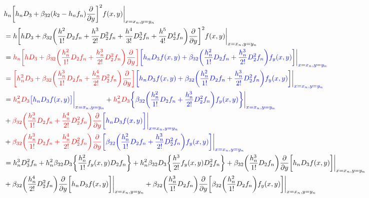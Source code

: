 \documentclass[12 pt]{article}
\begin{document}
{
\normalsize
\begin{align*}
&h_{n}\bigg[h_{n}D_{3}+\beta_{32}(k_{2}-h_{n}f_{n})\frac{\partial}{\partial y}\bigg]^{2}f(x,y)\bigg\vert_{x = x_{n}, y= y_{n}} \\
&= h\bigg[hD_{3} + \beta_{32}\bigg(\frac{h^{2}}{1!}D_{2}f_{n} + \frac{h^{3}}{2!}D_{2}^{2}f_{n} + \frac{h^{4}}{3!}D_{2}^{3}f_{n} + \frac{h^{5}}{4!}D_{2}^{4}f_{n}\bigg)\frac{\partial}{\partial y}\bigg]^{2}f(x,y)\bigg\vert_{x = x_{n}, y= y_{n}}\\
&= \color{red}h_{n}\bigg[hD_{3} + \beta_{32}\bigg(\frac{h_{n}^{2}}{1!}D_{2}f_{n} +\frac{h_{n}^{3}}{2!}D_{2}^{2}f_{n}  \bigg)\frac{\partial}{\partial y}\bigg]\color{blue}\bigg[h_{n}D_{3}f(x,y) + \beta_{32}\bigg(\frac{h_{n}^{2}}{1!}D_{2}f_{n} + \frac{h_{n}^{3}}{2!}D_{2}^{2}f_{n}\bigg)f_{y}(x,y)\bigg]\bigg\vert_{x = x_{n}, y= y_{n}}\\
&= \color{red}\bigg[h_{n}^{2}D_{3} + \beta_{32}\bigg(\frac{h_{n}^{3}}{1!}D_{2}f_{n} + \frac{h_{n}^{4}}{2!}D_{2}^{2}f_{n}  \bigg)\frac{\partial}{\partial y}\bigg]\color{blue}\bigg[h_{n}D_{3}f(x,y) + \beta_{32}\bigg(\frac{h_{n}^{2}}{1!}D_{2}f_{n} + \frac{h_{n}^{3}}{2!}D_{2}^{2}f_{n}\bigg)f_{y}(x,y)\bigg]\bigg\vert_{x = x_{n}, y= y_{n}}\\
&= \color{red}h_{n}^{2}D_{3}\color{blue}\big[h_{n}D_{3}f(x,y)\big]\bigg\vert_{x = x_{n}, y= y_{n}} \color{black} + \color{red}h_{n}^{2}D_{3}\color{blue}\bigg\{\beta_{32}\bigg(\frac{h_{n}^{2}}{1!}D_{2}f_{n} + \frac{h_{n}^{3}}{2!}D_{2}^{2}f_{n}\bigg)f_{y}(x,y)\bigg\}\bigg\vert_{x = x_{n}, y= y_{n}} \color{black}\\
&+ \color{red}\beta_{32}\bigg(\frac{h_{n}^{3}}{1!}D_{2}f_{n} + \frac{h_{n}^{4}}{2!}D_{2}^{2}f_{n} \bigg)\frac{\partial}{\partial y}\color{blue}\bigg[h_{n}D_{3}f(x,y)\bigg]\bigg\vert_{x = x_{n}, y= y_{n}}\\ 
&+ \color{red}\beta_{32}\bigg(\frac{h_{n}^{3}}{1!}D_{2}f_{n} + \frac{h_{n}^{4}}{2!}D_{2}^{2}f_{n} \bigg)\frac{\partial}{\partial y}\color{blue}\bigg[\beta_{32}\bigg(\frac{h_{n}^{2}}{1!}D_{2}f_{n} +\color{blue}\frac{h_{n}^{3}}{2!}D_{2}^{2}f_{n}\bigg)f_{y}(x,y)\bigg]\bigg\vert_{x = x_{n}, y= y_{n}}\\
&= h_{n}^{3}D_{3}^{2}f_{n} + h_{n}^{2}\beta_{32}D_{3}\bigg\{ \frac{h_{n}^{2}}{1!}f_{y}(x,y)D_{2}f_{n}\bigg\} + h_{n}^{2}\beta_{32}D_{3}\bigg\{\frac{h^{3}}{2!}f_{y}(x,y)D_{2}^{2}f_{n}\bigg\} + \beta_{32}\bigg(\frac{h_{n}^{3}}{1!}D_{2}f_{n}\bigg)\frac{\partial}{\partial y}\bigg[h_{n}D_{3}f(x,y)\bigg]\bigg\vert_{x = x_{n}, y= y_{n}}  \\
&+ \beta_{32}\bigg(\frac{h_{n}^{4}}{2!}D_{2}^{2}f_{n}\bigg)\frac{\partial}{\partial y}\bigg[h_{n}D_{3}f(x,y)\bigg]\bigg\vert_{x = x_{n}, y= y_{n}} + \beta_{32}\bigg(\frac{h_{n}^{3}}{1!}D_{2}f_{n}\bigg)\frac{\partial}{\partial y}\bigg[\beta_{32}\bigg(\frac{h_{n}^{2}}{1!}D_{2}f_{n}\bigg)f_{y}(x,y)\bigg]\bigg\vert_{x = x_{n}, y= y_{n}}\\

\end{align*}}
\end{document}
